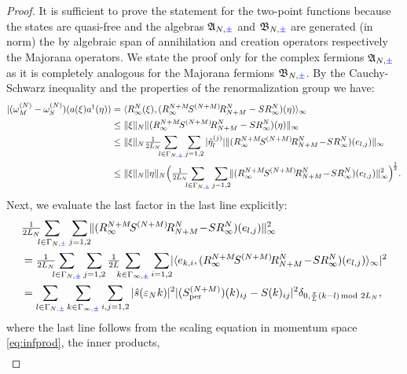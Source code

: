 \documentclass[a4paper, 11pt]{article}
\newcommand{\fA}{\mathfrak{A}}\newcommand{\cA}{\mathcal{A}}\newcommand{\dA}{\mathds{A}}\newcommand{\sA}{\mathscr{A}}
\newcommand{\fB}{\mathfrak{B}}\newcommand{\cB}{\mathcal{B}}\newcommand{\dB}{\mathds{B}}\newcommand{\sB}{\mathscr{B}}
\DeclareMathOperator{\1}{\mathds{1}}
\DeclareMathOperator{\per}{per}
\begin{document}
\begin{proof}
It is sufficient to prove the statement for the two-point functions because the states are quasi-free and the algebras $\fA_{N,{\color{blue}\pm}}$ and $\fB_{N,{\color{blue}\pm}}$ are generated (in norm) the by algebraic span of annihilation and creation operators respectively the Majorana operators. We state the proof only for the complex fermions $\fA_{N,{\color{blue}\pm}}$ as it is completely analogous for the Majorana fermions $\fB_{N,{\color{blue}\pm}}$. By the Cauchy-Schwarz inequality and the properties of the renormalization group we have:
\begin{align*}
|(\omega^{(N)}_{M}-\omega^{(N)}_{S})(a(\xi)a^{\dag}(\eta)) & = \langle R^{N}_{\infty}(\xi), (R^{N+M}_{\infty}\!S^{(N+M)}\!R^{N}_{N+M}-SR^{N}_{\infty})(\eta)\rangle_{\infty} \\
& \leq \|\xi\|_{N}\|(R^{N+M}_{\infty}\!S^{(N+M)}\!R^{N}_{N+M}-SR^{N}_{\infty})(\eta)\|_{\infty} \\
& \leq \|\xi\|_{N} \tfrac{1}{2L_{N}}\!\!\!\sum_{l\in\Gamma_{N,{\color{blue}\pm}}}\sum_{j=1,2}|\hat{\eta}^{(j)}_{l}| \|(R^{N+M}_{\infty}\!S^{(N+M)}\!R^{N}_{N+M}\!-\!SR^{N}_{\infty})(e_{l,j})\|_{\infty} \\
& \leq \|\xi\|_{N} \|\eta\|_{N} \Big(\tfrac{1}{2L_{N}}\!\!\!\sum_{l\in\Gamma_{N,{\color{blue}\pm}}}\sum_{j=1,2}\!\!\|(R^{N+M}_{\infty}\!S^{(N+M)}\!R^{N}_{N+M}\!-\!SR^{N}_{\infty})(e_{l,j})\|_{\infty}^{2}\Big)^{\!\frac{1}{2}}.
\end{align*}
Next, we evaluate the last factor in the last line explicitly:
\begin{align*}
 & \tfrac{1}{2L_{N}}\!\!\!\sum_{l\in\Gamma_{N,{\color{blue}\pm}}}\sum_{j=1,2}\!\!\|(R^{N+M}_{\infty}\!S^{(N+M)}\!R^{N}_{N+M}\!-\!SR^{N}_{\infty})(e_{l,j})\|_{\infty}^{2} \\
 & = \tfrac{1}{2L_{N}}\!\!\!\sum_{l\in\Gamma_{N,{\color{blue}\pm}}}\sum_{j=1,2}\tfrac{1}{2L}\!\!\!\sum_{k\in\Gamma_{\infty,{\color{blue}\pm}}}\sum_{i=1,2}\!\!|\langle e_{k,i},(R^{N+M}_{\infty}\!S^{(N+M)}\!R^{N}_{N+M}\!-\!SR^{N}_{\infty})(e_{l,j})\rangle_{\infty}|^{2} \\
 & = \sum_{l\in\Gamma_{N,{\color{blue}\pm}}}\sum_{k\in\Gamma_{\infty,{\color{blue}\pm}}}\sum_{i,j=1,2}|\hat{s}(\vep_{N}k)|^{2}|(S^{(N+M)}_{\per})(k)_{ij}-S(k)_{ij}|^{2}\delta_{0,\frac{\pi}{L}(k-l)\!\!\!\mod 2L_{N}},
\end{align*}
where the last line follows from the scaling equation in momentum space \eqref{eq:infprod}, the inner products,
\begin{align}

\end{align}
\end{proof}
\end{document}
